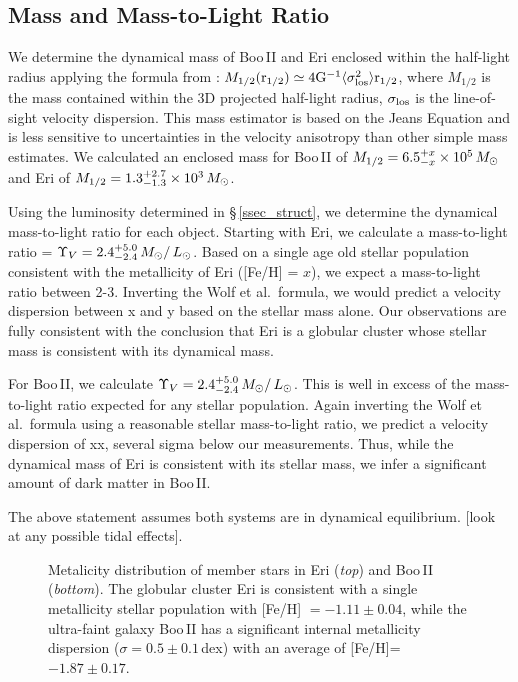 \documentclass{../tex_files/emulateapj}
\newcommand{\Msun}{\mbox{\,$M_{\odot}$}}
\newcommand{\Lsun}{\mbox{\,$L_{\odot}$}}
\begin{document}
\subsection{Mass and Mass-to-Light Ratio}\label{ssec_mass}

We determine the dynamical mass of Boo\,II and Eri enclosed within the
half-light radius applying the formula from \citet{wolf10a}:
$M_{1/2}(\rm r_{\rm 1/2}) \simeq 4G^{-1}\langle \sigma_{\rm los}^2
\rangle \rm r_{\rm 1/2}$, where $M_{1/2}$ is the mass contained within
the 3D projected half-light radius, $\sigma_{\rm los}$ is the
line-of-sight velocity dispersion.  This mass estimator is based on
the Jeans Equation and is less sensitive to uncertainties in the
velocity anisotropy than other simple mass estimates.  We calculated
an enclosed mass for Boo\,II of $M_{1/2} = 6.5^{+x}_{-x} \times 10^5
\Msun$ and Eri of $M_{1/2} = 1.3^{+2.7}_{-1.3} \times 10^3 \Msun$.   


Using the luminosity determined in \S\,\ref{ssec_struct}, we determine
the dynamical mass-to-light ratio for each object.  Starting with Eri,
we calculate a mass-to-light ratio = $\Upsilon_V =2.4^{+5.0}_{-2.4}
\Msun/\Lsun$.   Based on a single age old stellar population
consistent with the metallicity of Eri ([Fe/H] = $x$), we expect a
mass-to-light ratio between 2-3.   Inverting the Wolf et al.~formula,
we would predict a velocity dispersion between x and y based on the
stellar mass alone.   Our observations are fully consistent with the
conclusion that Eri is a globular cluster whose stellar mass is
consistent with its dynamical mass.

For Boo\,II, we calculate $\Upsilon_V =2.4^{+5.0}_{-2.4} \Msun/\Lsun$.
This is well in excess of the mass-to-light ratio expected for any
stellar population.  Again inverting the Wolf et al.~formula using a
reasonable stellar mass-to-light ratio, we predict a velocity
dispersion of xx, several sigma below our measurements.  Thus, while
the dynamical mass of Eri is consistent with its stellar mass, we
infer a significant amount of dark matter in Boo\,II.

The above statement assumes both systems are in dynamical
equilibrium.  [look at any possible tidal effects].

\begin{figure}
\caption{Metalicity distribution of member stars in Eri ({\it top})
  and Boo\,II ({\it bottom}).  The globular cluster Eri is consistent
  with a single metallicity stellar population with [Fe/H] $=-1.11 \pm
  0.04$, while the ultra-faint galaxy Boo\,II has a significant
  internal metallicity dispersion ($\sigma = 0.5 \pm 0.1$\,dex) with
  an average of [Fe/H]=$-1.87\pm 0.17$.  \label{fig_metals}}
\end{figure}
\end{document}
